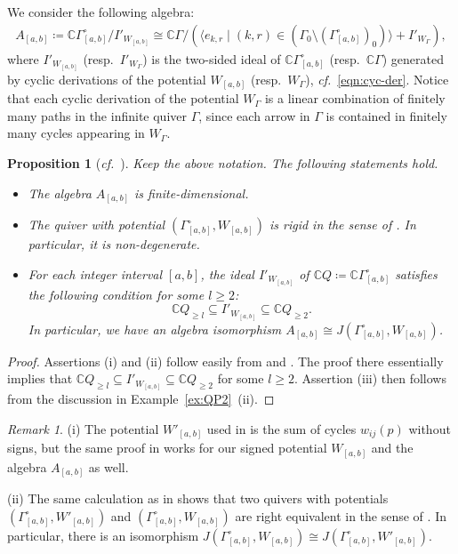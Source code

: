 \documentclass[12pt]{amsart}
\newtheorem{proposition}[theorem]{Proposition}
\theoremstyle{definition}
\theoremstyle{remark}
\newtheorem{remark}[theorem]{Remark}
\numberwithin{equation}{section}
\newcommand{\confer}{\textit{cf.}\ }
\begin{document}
We consider the following algebra: 
\begin{eqnarray}\label{eqn:A_ab}
A_{[a,b]}\coloneqq \mathbb{C}\Gamma_{[a,b]}^{\circ}/I'_{W_{[a,b]}}\cong  \mathbb C\Gamma/(\langle e_{k,r} \mid (k,r)\in \left(\Gamma_0\setminus (\Gamma_{[a,b]}^{\circ})_0\right)\rangle+ I'_{W_{\Gamma}}),
\end{eqnarray}
where $I'_{W_{[a,b]}}$ (resp.\ $I'_{W_\Gamma}$) is the two-sided ideal of $\mathbb{C}\Gamma_{[a,b]}^{\circ}$  (resp.\ $\mathbb C\Gamma$) generated by cyclic derivations of the potential $W_{[a,b]}$ (resp.\ $W_{\Gamma}$), \confer \eqref{eqn:cyc-der}. Notice that each cyclic derivation of the potential $W_\Gamma$ is a linear combination of finitely many paths in the infinite quiver $\Gamma$, since each arrow in $\Gamma$ is contained in finitely many cycles appearing in $W_\Gamma$.
\begin{proposition}[{\confer \cite[Proposition 4.17]{HL16}}]\label{pro:HL16-4.17}
    Keep the above notation. The following statements hold.
\begin{itemize}
    \item [(i)] The  algebra $A_{[a,b]}$ is finite-dimensional.
    \item[(ii)] The quiver with potential $(\Gamma_{[a,b]}^\circ, W_{[a,b]})$ is rigid in the sense of \cite[(8.1)]{DWZ08}. In particular, it is non-degenerate.
    \item[(iii)]  For each integer interval $[a,b]$, the ideal $I'_{W_{[a,b]}}$ of $\mathbb{C}Q\coloneq \mathbb C\Gamma^\circ_{[a,b]}$ satisfies the following condition for some $l \geq 2$:
    \[\mathbb{C}Q_{\geq l} \subseteq I'_{W_{[a,b]}} \subseteq \mathbb{C}Q_{\geq 2}.\]
    In particular, we have an algebra isomorphism $A_{[a,b]} \cong J(\Gamma_{[a,b]}^\circ, W_{[a,b]})$.
\end{itemize}
\end{proposition}

\begin{proof} 
Assertions (i) and (ii) follow easily from \cite[Proposition~4.17]{HL16} and \cite[Corollary~8.2, Proposition~8.9]{DWZ08}. The proof there essentially implies that $\mathbb{C}Q_{\geq l} \subseteq I'_{W_{[a,b]}} \subseteq \mathbb{C}Q_{\geq 2}$ for some $l\geq 2$. Assertion (iii) then follows from the discussion in Example~\ref{ex:QP2}~(ii).
\end{proof}


\begin{remark}\label{rem:HL}
(i) The potential $W'_{[a,b]}$ used
in  \cite{HL16} is the sum of cycles $w_{ij}(p)$ without signs, but the same proof in \cite[Proposition 4.17]{HL16} works for our signed potential $W_{[a,b]}$ and the algebra $A_{[a,b]}$ as well.

(ii) The same calculation as in \cite[Remark 4.3]{FM} shows that two quivers with potentials $(\Gamma_{[a,b]}^\circ, W'_{[a,b]})$ and $(\Gamma_{[a,b]}^\circ, W_{[a,b]})$ are right equivalent in the sense of \cite[Definition 4.2]{DWZ08}. In particular, there is an 
isomorphism $J(\Gamma_{[a,b]}^\circ, W_{[a,b]}) \cong J(\Gamma_{[a,b]}^\circ, W'_{[a,b]})$.
\end{remark}
\end{document}
